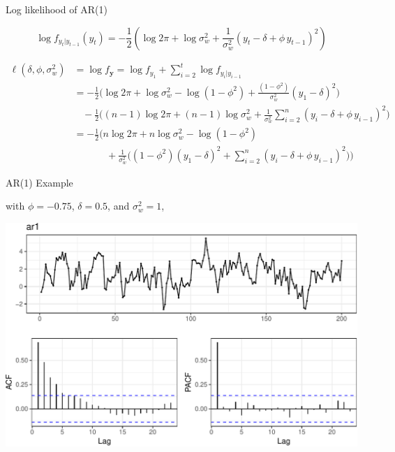\documentclass[11pt,ignorenonframetext,]{beamer}
\begin{document}
\begin{frame}[t]{%
\protect\hypertarget{log-likelihood-of-ar1}{%
Log likelihood of AR(1)}}

\scriptsize

\[
\log f_{y_{t} | y_{t-1}}(y_t) = -\frac{1}{2}\left( \log 2\pi + \log \sigma^2_w + \frac{1}{\sigma_w^2} (y_t -\delta+\phi\, y_{t-1})^2 \right)
\]

\[
\begin{aligned}
\ell(\delta, \phi, \sigma^2_w) 
  &= \log f_{\symbf{y}} = \log f_{y_1} + \sum_{i=2}^t \log f_{y_{i}|y_{i-1}} \\
  &= - \frac{1}{2} \bigg(\log 2\pi + \log \sigma_w^2 - \log (1-\phi^2) + \frac{(1-\phi^2)}{\sigma_w^2 }(y_1-\delta)^2 \bigg) \\
  & ~~~~ - \frac{1}{2} \bigg( (n-1) \log 2\pi + (n-1) \log \sigma_w^2 + \frac{1}{\sigma_w^2} \sum_{i=2}^n (y_i -\delta+\phi\, y_{i-1})^2 \bigg) \\
  &= - \frac{1}{2} \bigg( n \log 2\pi + n \log \sigma_w^2 - \log (1-\phi^2) \\
  &~~~~~~~~~~~~~~~+ \frac{1}{\sigma_w^2} \bigg( (1-\phi^2)(y_1-\delta)^2 + \sum_{i=2}^n (y_i -\delta+\phi\, y_{i-1})^2 \bigg) \bigg)
\end{aligned}
\]

\end{frame}

\begin{frame}[t]{%
\protect\hypertarget{ar1-example}{%
AR(1) Example}}

with \(\phi = -0.75\), \(\delta=0.5\), and \(\sigma_w^2=1\),

\begin{center}\includegraphics[width=\textwidth]{Lec10_files/figure-beamer/unnamed-chunk-1-1} \end{center}

\end{frame}
\end{document}

